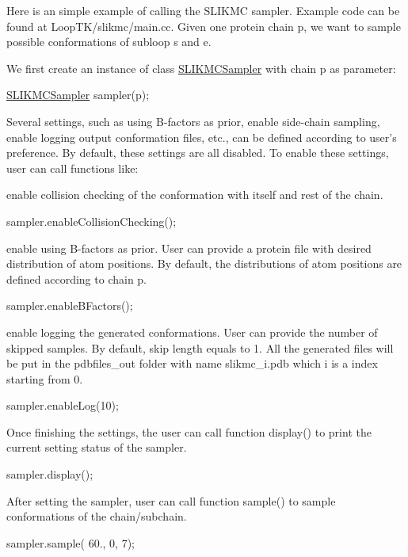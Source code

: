 Here is an simple example of calling the S\-L\-I\-K\-M\-C sampler. Example code can be found at Loop\-T\-K/slikmc/main.\-cc. Given one protein chain p, we want to sample possible conformations of subloop s and e.

We first create an instance of class \hyperlink{classSLIKMCSampler}{S\-L\-I\-K\-M\-C\-Sampler} with chain p as parameter\-:

\hyperlink{classSLIKMCSampler}{S\-L\-I\-K\-M\-C\-Sampler} sampler(p);

Several settings, such as using B-\/factors as prior, enable side-\/chain sampling, enable logging output conformation files, etc., can be defined according to user's preference. By default, these settings are all disabled. To enable these settings, user can call functions like\-:

enable collision checking of the conformation with itself and rest of the chain.

sampler.\-enable\-Collision\-Checking();

enable using B-\/factors as prior. User can provide a protein file with desired distribution of atom positions. By default, the distributions of atom positions are defined according to chain p.

sampler.\-enable\-B\-Factors();

enable logging the generated conformations. User can provide the number of skipped samples. By default, skip length equals to 1. All the generated files will be put in the pdbfiles\-\_\-out folder with name slikmc\-\_\-i.\-pdb which i is a index starting from 0.

sampler.\-enable\-Log(10);

Once finishing the settings, the user can call function display() to print the current setting status of the sampler.

sampler.\-display();

After setting the sampler, user can call function sample() to sample conformations of the chain/subchain.

sampler.\-sample( 60., 0, 7); 